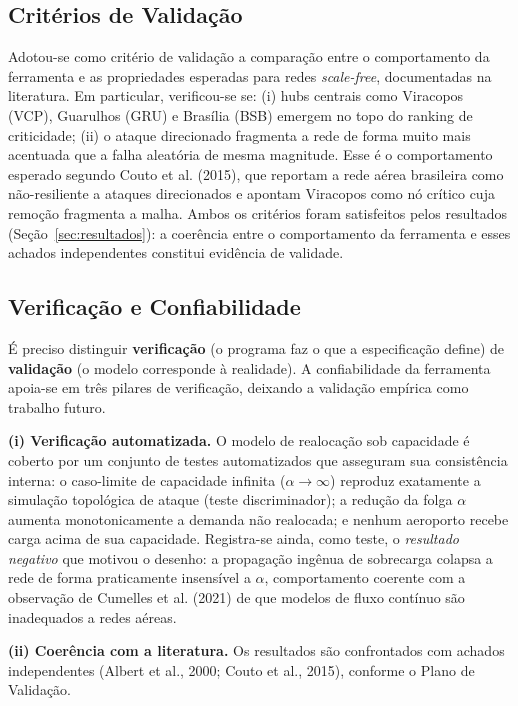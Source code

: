 \documentclass[12pt,a4paper]{article}
\begin{document}
\subsection{Critérios de Validação}

Adotou-se como critério de validação a comparação entre o comportamento da ferramenta e as
propriedades esperadas para redes \textit{scale-free}, documentadas na literatura. Em particular,
verificou-se se: (i) hubs centrais como Viracopos (VCP), Guarulhos (GRU) e Brasília (BSB) emergem
no topo do ranking de criticidade; (ii) o ataque direcionado fragmenta a rede de forma muito mais
acentuada que a falha aleatória de mesma magnitude. Esse é o comportamento esperado segundo Couto
et al. (2015), que reportam a rede aérea brasileira como não-resiliente a ataques direcionados e
apontam Viracopos como nó crítico cuja remoção fragmenta a malha. Ambos os critérios foram
satisfeitos pelos resultados (Seção~\ref{sec:resultados}): a coerência entre o comportamento da
ferramenta e esses achados independentes constitui evidência de validade.

\subsection{Verificação e Confiabilidade}

É preciso distinguir \textbf{verificação} (o programa faz o que a especificação define) de
\textbf{validação} (o modelo corresponde à realidade). A confiabilidade da ferramenta apoia-se em
três pilares de verificação, deixando a validação empírica como trabalho futuro.

\textbf{(i) Verificação automatizada.} O modelo de realocação sob capacidade é coberto por um
conjunto de testes automatizados que asseguram sua consistência interna: o caso-limite de
capacidade infinita ($\alpha \to \infty$) reproduz exatamente a simulação topológica de ataque
(teste discriminador); a redução da folga $\alpha$ aumenta monotonicamente a demanda não realocada;
e nenhum aeroporto recebe carga acima de sua capacidade. Registra-se ainda, como teste, o
\textit{resultado negativo} que motivou o desenho: a propagação ingênua de sobrecarga colapsa a
rede de forma praticamente insensível a $\alpha$, comportamento coerente com a observação de
Cumelles et al. (2021) de que modelos de fluxo contínuo são inadequados a redes aéreas.

\textbf{(ii) Coerência com a literatura.} Os resultados são confrontados com achados independentes
(Albert et al., 2000; Couto et al., 2015), conforme o Plano de Validação.
\end{document}
